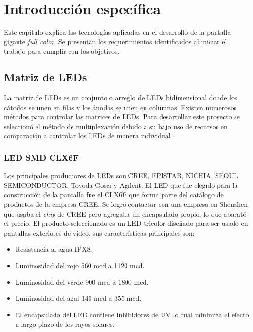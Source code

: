 \chapter{Introducción específica} %

\label{Chapter2}

Este capítulo explica las tecnologías aplicadas en el desarrollo de la pantalla gigante \textit{full color}. Se presentan los requerimientos identificados al iniciar el trabajo para cumplir con los objetivos.
\section{Matriz de LEDs}
La matriz de LEDs es un conjunto o arreglo de LEDs  bidimensional donde los cátodos se unen en filas y los ánodos se unen en columnas. Existen numerosos métodos para controlar las matrices de LEDs. Para desarrollar este proyecto se seleccionó el método de multiplexación debido a su bajo uso de recursos en comparación a controlar los LEDs de manera individual \citep{CONCEPTOMATRIZ}.

\subsection{LED SMD CLX6F}
Los principales productores de LEDs son CREE, EPISTAR, NICHIA, SEOUL SEMICONDUCTOR, Toyoda Gosei y Agilent.
El LED que fue elegido para la construcción de la pantalla fue el CLX6F que forma parte del catálogo de productos de la empresa CREE. Se logró contactar con una empresa en Shenzhen que usaba el \textit{chip} de CREE pero agregaba un encapsulado propio, lo que abarató el precio. El producto seleccionado es un LED tricolor diseñado para ser usado en pantallas exteriores de vídeo, sus características principales son:



\begin{itemize}
\item Resistencia al agua IPX8.
\item Luminosidad del rojo 560 mcd a 1120 mcd.
\item Luminosidad del verde 900 mcd a 1800 mcd.
\item Luminosidad del azul 140 mcd a 355 mcd.
\item El encapsulado del LED contiene inhibidores de UV lo cual minimiza el efecto a largo plazo de los rayos solares.
\end{itemize}

